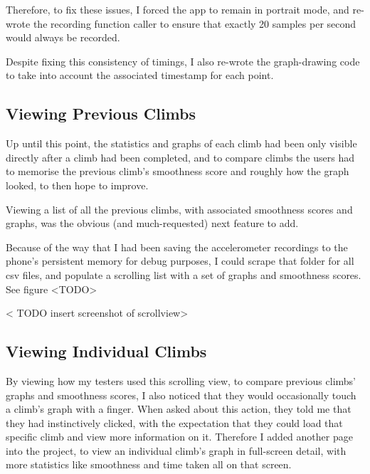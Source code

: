 Therefore, to fix these issues, I forced the app to remain in portrait mode, and re-wrote the recording function caller to ensure that exactly 20 samples per second would always be recorded.

Despite fixing this consistency of timings, I also re-wrote the graph-drawing code to take into account the associated timestamp for each point.






\subsection{Viewing Previous Climbs}
Up until this point, the statistics and graphs of each climb had been only visible directly after a climb had been completed, and to compare climbs the users had to memorise the previous climb's smoothness score and roughly how the graph looked, to then hope to improve.

Viewing a list of all the previous climbs, with associated smoothness scores and graphs, was the obvious (and much-requested) next feature to add.

Because of the way that I had been saving the accelerometer recordings to the phone's persistent memory for debug purposes, I could scrape that folder for all csv files, and populate a scrolling list with a set of graphs and smoothness scores.
See figure <TODO>

< TODO insert screenshot of scrollview>

\subsection{Viewing Individual Climbs}
By viewing how my testers used this scrolling view, to compare previous climbs' graphs and smoothness scores, I also noticed that they would occasionally touch a climb's graph with a finger.
When asked about this action, they told me that they had instinctively clicked, with the expectation that they could load that specific climb and view more information on it.
Therefore I added another page into the project, to view an individual climb's graph in full-screen detail, with more statistics like smoothness and time taken all on that screen.

